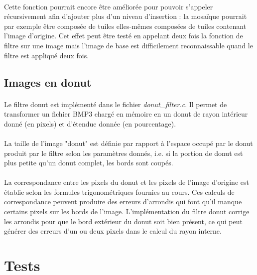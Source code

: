 \documentclass{article}
\begin{document}
    \paragraph{}
    Cette fonction pourrait encore être améliorée pour pouvoir s'appeler récursivement afin d'ajouter plus d'un niveau d'insertion : la mosaïque pourrait par exemple être composée de tuiles elles-mêmes composées de tuiles contenant l'image d'origine. Cet effet peut être testé en appelant deux fois la fonction de filtre sur une image mais l'image de base est difficilement reconnaissable quand le filtre est appliqué deux fois.
    

    \subsection{Images en donut}
    \paragraph{}
    Le filtre donut est implémenté dans le fichier \emph{donut\_filter.c}. Il permet de transformer un fichier BMP3 chargé en mémoire en un donut de rayon intérieur donné (en pixels) et d'étendue donnée (en pourcentage).

    \paragraph{}
    La taille de l'image "donut" est définie par rapport à l'espace occupé par le donut produit par le filtre selon les paramètres donnés, i.e. si la portion de donut est plus petite qu'un donut complet, les bords sont coupés.

    \paragraph{}
    La correspondance entre les pixels du donut et les pixels de l'image d'origine est établie selon les formules trigonométriques fournies au cours. Ces calculs de correspondance peuvent produire des erreurs d'arrondis qui font qu'il manque certains pixels sur les bords de l'image. L'implémentation du filtre donut corrige les arrondis pour que le bord extérieur du donut soit bien présent, ce qui peut générer des erreurs d'un ou deux pixels dans le calcul du rayon interne.



    \newpage
    \section{Tests}
\end{document}

